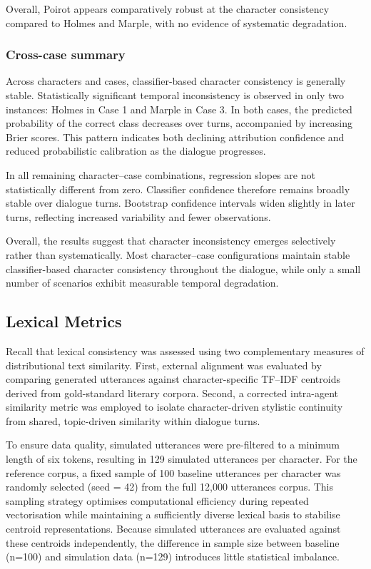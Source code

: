 \documentclass{article}
\begin{document}
Overall, Poirot appears comparatively robust at the character consistency compared to Holmes and Marple, with no evidence of systematic degradation.

\subsubsection{Cross-case summary}

Across characters and cases, classifier-based character consistency is generally stable. Statistically significant temporal inconsistency is observed in only two instances: Holmes in Case 1 and Marple in Case 3. In both cases, the predicted probability of the correct class decreases over turns, accompanied by increasing Brier scores. This pattern indicates both declining attribution confidence and reduced probabilistic calibration as the dialogue progresses.

In all remaining character–case combinations, regression slopes are not statistically different from zero. Classifier confidence therefore remains broadly stable over dialogue turns. Bootstrap confidence intervals widen slightly in later turns, reflecting increased variability and fewer observations.

Overall, the results suggest that character inconsistency emerges selectively rather than systematically. Most character–case configurations maintain stable classifier-based character consistency throughout the dialogue, while only a small number of scenarios exhibit measurable temporal degradation.

\subsection{Lexical Metrics}

Recall that lexical consistency was assessed using two complementary measures of distributional text similarity. First, external alignment was evaluated by comparing generated utterances against character-specific TF–IDF centroids derived from gold-standard literary corpora. Second, a corrected intra-agent similarity metric was employed to isolate character-driven stylistic continuity from shared, topic-driven similarity within dialogue turns.

To ensure data quality, simulated utterances were pre-filtered to a minimum length of six tokens, resulting in 129 simulated utterances per character. For the reference corpus, a fixed sample of 100 baseline utterances per character was randomly selected (seed = 42) from the full 12,000 utterances corpus. This sampling strategy optimises computational efficiency during repeated vectorisation while maintaining a sufficiently diverse lexical basis to stabilise centroid representations. Because simulated utterances are evaluated against these centroids independently, the difference in sample size between baseline (n=100) and simulation data (n=129) introduces little statistical imbalance.
\end{document}

